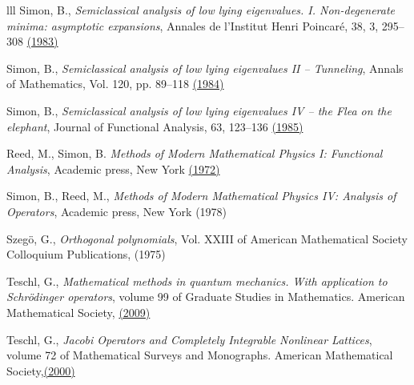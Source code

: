 \documentclass[12pt, reqno]{amsart}
\theoremstyle{definition}
\numberwithin{equation}{section}
\begin{document}
\begin{thebibliography}{lll}
 Simon, B., \textit{Semiclassical analysis of low lying eigenvalues. I.
Non-degenerate minima: asymptotic expansions}, Annales de l'Institut Henri Poincar\'{e}, 38, 3,  295--308 \href{https://www.numdam.org/item/?id=AIHPA_1983__38_3_295_0}{(1983)}

Simon, B., \textit{Semiclassical analysis of low lying eigenvalues II – Tunneling},
Annals of Mathematics, Vol. 120, pp. 89--118 \href{https://doi.org/10.2307/2007072}{(1984)}

Simon, B., \textit{Semiclassical analysis of low lying eigenvalues IV – the Flea on the elephant},
Journal of Functional Analysis, 63, 123--136 \href{https://doi.org/10.1016/0022-1236(85)90101-6}{(1985)}

 Reed, M., Simon, B. \textit{Methods of Modern Mathematical Physics I: Functional Analysis},
Academic press, New York \href{https://doi.org/10.1016/B978-0-12-585001-8.X5001-6}{(1972)}

Simon, B., Reed, M., \textit{Methods of Modern Mathematical Physics IV: Analysis of Operators},
Academic press, New York (1978)

 Szeg\"{o}, G., \textit{Orthogonal polynomials}, Vol. XXIII of American Mathematical Society Colloquium Publications, (1975)

 Teschl, G., \textit{Mathematical methods in quantum mechanics. With application to Schr\"odinger operators}, volume 99
of Graduate Studies in Mathematics. American Mathematical Society, \href{https://doi.org/10.1090/gsm/099}{(2009)}


 Teschl, G., \textit{Jacobi Operators and Completely Integrable Nonlinear
Lattices}, volume 72 of 	Mathematical Surveys and Monographs. American Mathematical Society,\href{https://www.mat.univie.ac.at/~gerald/ftp/book-jac/index.html}{(2000)}


\end{thebibliography}

\end{document}

